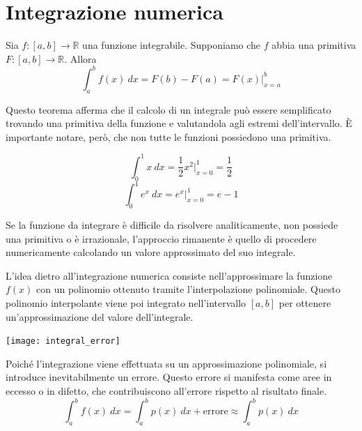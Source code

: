 \documentclass{article}
\begin{document}
\section{Integrazione numerica}
\begin{theorem}
    Sia $f: [a,b]\rightarrow \mathbb{R}$ una funzione integrabile. Supponiamo
    che $f$ abbia una primitiva $F:[a,b]\rightarrow \mathbb{R}$. Allora
    $$\displaystyle\int_{a}^{b}f(x)\ dx=F(b)-F(a)=F(x)\big|_{x=a}^b$$
\end{theorem}
Questo teorema afferma che il calcolo di un integrale può essere semplificato
trovando una primitiva della funzione e valutandola agli estremi
dell'intervallo. È importante notare, però, che non tutte le funzioni
possiedono una primitiva. 
\begin{example}
   $$\int_{0}^{1}x\ dx=\frac{1}{2}x^2\bigg|_{x=0}^{1}=\frac{1}{2}$$ 
   $$\int_{0}^{1}e^x\ dx=e^x \big|_{x=0}^{1}=e-1$$
\end{example}
Se la funzione da integrare è difficile da risolvere analiticamente, non
possiede una primitiva o è irrazionale, l'approccio rimanente è quello di
procedere numericamente calcolando un valore approssimato del suo integrale. 

L'idea dietro all'integrazione numerica  consiste nell'approssimare la
funzione $f(x)$ con un polinomio ottenuto tramite l'interpolazione
polinomiale. Questo polinomio interpolante viene poi integrato nell'intervallo
$[a,b]$ per ottenere un'approssimazione del valore dell'integrale.
\begin{center}
    \texttt{[image: integral\_error]}
\end{center}
Poiché l'integrazione viene effettuata su un approssimazione polinomiale, si
introduce inevitabilmente un errore. Questo errore si manifesta come aree in
eccesso o in difetto, che contribuiscono all'errore rispetto al risultato
finale.
$$\displaystyle\int_{a}^{b}f(x)\ dx= \displaystyle\int_{a}^{b}p(x)\
dx+\text{errore}\approx \displaystyle\int_{a}^{b}p(x)\ dx$$
\end{document}

